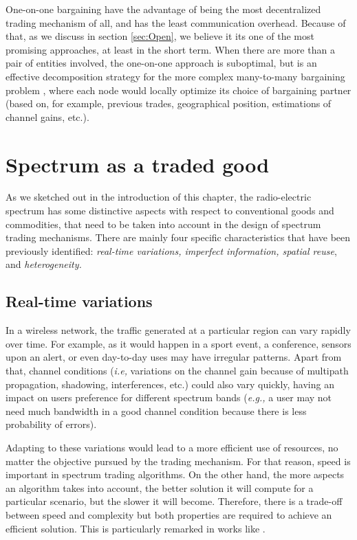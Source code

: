 One-on-one bargaining have the advantage of being the most decentralized trading mechanism of all, and has the least communication overhead. Because of that, as we discuss in section \ref{sec:Open}, we believe it its one of the most promising approaches, at least in the short term. When there are more than a pair of entities involved, the one-on-one approach is suboptimal, but is an effective decomposition strategy for the more complex many-to-many bargaining problem \cite{ref:Yan2012}, where each node would locally optimize its choice of bargaining partner (based on, for example, previous trades, geographical position, estimations of channel gains, etc.). 		

\section{Spectrum as a traded good}
\label{sec:TradedGood}
As we sketched out in the introduction of this chapter, the radio-electric spectrum has some distinctive aspects with respect to conventional goods and commodities, that need to be taken into account in the design of spectrum trading mechanisms. There are mainly four specific characteristics that have been previously identified: \textit{real-time variations, imperfect information, spatial reuse}, and \textit{heterogeneity.}

\subsection{Real-time variations}
\label{subsec:Real}
In a wireless network, the traffic generated at a particular region can vary rapidly over time. For example, as it would happen in a sport event, a conference, sensors upon an alert, or even day-to-day uses may have irregular patterns. Apart from that, channel conditions (\textit{i.e,} variations on the channel gain because of multipath propagation, shadowing, interferences, etc.) could also vary quickly, having an impact on users preference for different spectrum bands (\textit{e.g.,} a user may not need much bandwidth in a good channel condition because there is less probability of errors). 

Adapting to these variations would lead to a more efficient use of resources, no matter the objective pursued by the trading mechanism. For that reason, speed is important in spectrum trading algorithms. On the other hand, the more aspects an algorithm takes into account, the better solution it will compute for a particular scenario, but the slower it will become. Therefore, there is a trade-off between speed and complexity but both properties are required to achieve an efficient solution. This is particularly remarked in works like \cite{ref:Zhou2008,ref:Gandhi2008}.

